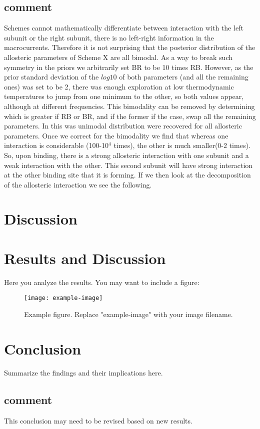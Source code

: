 \documentclass[a4paper,12pt]{article}
\begin{document}
	\subsection{comment}
		Schemes cannot mathematically differentiate between interaction with the left subunit or the right subunit, there is no left-right information in the macrocurrents. Therefore it is not surprising that the posterior distribution of the allosteric parameters of Scheme X are all bimodal. As a way to break such symmetry in the priors we arbitrarily set BR to be 10 times RB. However, as the prior standard deviation of the $log10$ of both parameters (and all the remaining ones) was set to be 2, there was enough exploration at low thermodynamic temperatures to jump from one minimum to the other, so both values appear, although at different frequencies. 
		This bimodality can be removed by determining which is greater if RB or BR, and if the former if the case, swap all the remaining parameters. In this was unimodal distribution were recovered for all allosteric parameters. 
		Once we correct for the bimodality we find that whereas one interaction is considerable (100-10$^4$ times), the other is much smaller(0-2 times). So, upon binding, there is a strong allosteric interaction with one subunit and a weak interaction with the other. This second subunit will have strong interaction at the other binding site that it is forming. 
		If we then look at the decomposition of the allosteric interaction we see the following.
		
		
	
	
	\section{Discussion}
	\label{dis}
	
	
	
	\section{Results and Discussion}
	Here you analyze the results. You may want to include a figure:
	
	\begin{figure}[h]
		\centering
		\texttt{[image: example-image]} %
		\caption{Example figure. Replace "example-image" with your image filename.}
		\label{fig:example}
	\end{figure}
	
	\section{Conclusion}
	Summarize the findings and their implications here.
	
	\subsection{comment}
		This conclusion may need to be revised based on new results.
	
	
	
\end{document}
